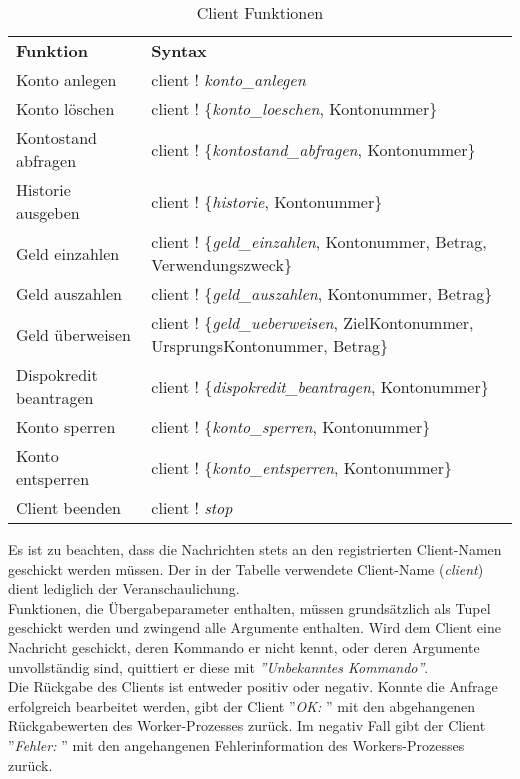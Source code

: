 \begin{table}[H]
\caption{Client Funktionen}
\begin{center}
\begin{tabular}[t]{l|l}
\textbf{Funktion} 	& \textbf{Syntax} \\
Konto anlegen 			& client ! \textit{konto\_anlegen}\\
Konto löschen 			& client ! \{\textit{konto\_loeschen}, Kontonummer\}\\
Kontostand abfragen 	& client ! \{\textit{kontostand\_abfragen}, Kontonummer\}\\
Historie ausgeben 		& client ! \{\textit{historie}, Kontonummer\}\\
Geld einzahlen			& client ! \{\textit{geld\_einzahlen}, Kontonummer, Betrag, Verwendungszweck\}\\
Geld auszahlen 			& client ! \{\textit{geld\_auszahlen}, Kontonummer, Betrag\}\\
Geld überweisen 		& client ! \{\textit{geld\_ueberweisen}, ZielKontonummer, UrsprungsKontonummer, Betrag\}\\
Dispokredit beantragen 	& client ! \{\textit{dispokredit\_beantragen}, Kontonummer\}\\
Konto sperren 			& client ! \{\textit{konto\_sperren}, Kontonummer\}\\
Konto entsperren 		& client ! \{\textit{konto\_entsperren}, Kontonummer\}\\
Client beenden 			& client ! \textit{stop}
\end{tabular}
\end{center}
\end{table}
Es ist zu beachten, dass die Nachrichten stets an den registrierten Client-Namen geschickt werden müssen. Der in der Tabelle verwendete Client-Name (\textit{client}) dient lediglich der Veranschaulichung.\\
Funktionen, die Übergabeparameter enthalten, müssen grundsätzlich als Tupel geschickt werden und zwingend alle Argumente enthalten. Wird dem Client eine Nachricht geschickt, deren Kommando er nicht kennt, oder deren Argumente unvollständig sind, quittiert er diese mit \textit{''Unbekanntes Kommando''}.\\
Die Rückgabe des Clients ist entweder positiv oder negativ. Konnte die Anfrage erfolgreich bearbeitet werden, gibt der Client ''\textit{OK: }'' mit den abgehangenen Rückgabewerten des Worker-Prozesses zurück. Im negativ Fall gibt der Client ''\textit{Fehler: }'' mit den angehangenen Fehlerinformation des Workers-Prozesses zurück.\\
